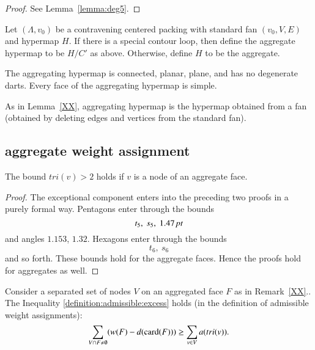 \begin{proof} See Lemma~\ref{lemma:deg5}.
\end{proof}

\begin{definition}[aggregate]  Let $(\Lambda,v_0)$ be a contravening
centered packing with
standard fan $(v_0,V,E)$ and hypermap $H$. 
If there is a special contour loop, then define the aggregate hypermap
to be $H/C'$ as above.  Otherwise, define $H$ to be the aggregate.
\end{definition}

\begin{lemma}
The aggregating hypermap is connected, planar, plane,
and has no degenerate darts.   Every face of the aggregating hypermap
is simple. 
\end{lemma}

As in Lemma~\ref{XX}, aggregating hypermap is the hypermap
obtained from a fan (obtained by deleting edges and
vertices from the standard fan).


\subsection{aggregate weight assignment}

\begin{lemma} The bound $tri(v)>2$ holds if $v$ is a node
of an aggregate face.
\end{lemma}

\begin{proof}
The exceptional component enters into the preceding two proofs in a
purely formal way.  Pentagons enter through the bounds
    $$t_5,\ s_5,\ 1.47\,\hbox{\it pt}$$
and angles $1.153$, $1.32$.  Hexagons enter through the bounds
    $$t_6,\ s_6$$
and so forth.  These bounds hold for the aggregate faces.  Hence the
proofs hold for aggregates as well.
\end{proof}

\begin{lemma}
Consider a separated set of nodes $V$ on an aggregated face $F$ as
in Remark~\ref{XX}..  The Inequality
\ref{definition:admissible:excess} holds (in the definition of
admissible weight assignments):
    $$\sum_{V\cap F\ne\emptyset} (w(F) -d({\operatorname{card}}(F)))
            \ge \sum_{v\in V} a(tri(v)).$$
\end{lemma}

